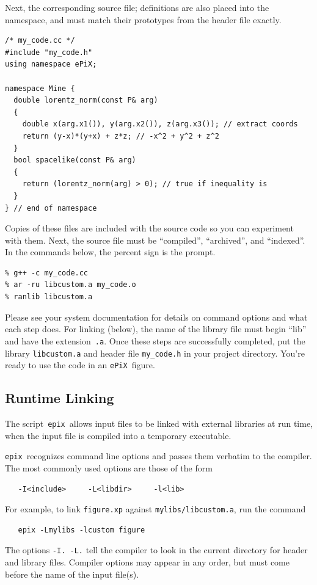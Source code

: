 \documentclass[12pt]{report}
\newcommand{\code}[1]{\texttt{#1}}
\newcommand{\filename}[1]{\texttt{#1}}
\newcommand{\ePiX}{\code{ePiX}}
\newcommand{\epix}{\code{epix}}
\begin{document}
Next, the corresponding source file; definitions are also placed into
the namespace, and must match their prototypes from the header file
exactly.
\begin{verbatim}
/* my_code.cc */
#include "my_code.h"
using namespace ePiX;

namespace Mine {
  double lorentz_norm(const P& arg)
  {
    double x(arg.x1()), y(arg.x2()), z(arg.x3()); // extract coords
    return (y-x)*(y+x) + z*z; // -x^2 + y^2 + z^2
  }
  bool spacelike(const P& arg)
  {
    return (lorentz_norm(arg) > 0); // true if inequality is
  }
} // end of namespace
\end{verbatim}
Copies of these files are included with the source code so you can
experiment with them. Next, the source file must be ``compiled'',
``archived'', and ``indexed''. In the commands below, the percent sign
is the prompt.
\begin{verbatim}
% g++ -c my_code.cc
% ar -ru libcustom.a my_code.o
% ranlib libcustom.a
\end{verbatim}
Please see your system documentation for details on command options
and what each step does. For linking (below), the name of the library
file must begin ``lib'' and have the extension~\filename{.a}. Once these
steps are successfully completed, put the library \filename{libcustom.a}
and header file \filename{my\_code.h} in your project directory. You're
ready to use the code in an \ePiX\ figure.


\subsection*{Runtime Linking}

The script~\epix\ allows input files to be linked with external
libraries at run time, when the input file is compiled into a
temporary executable.

\epix\ recognizes command line options and passes them verbatim to the
compiler. The most commonly used options are those of the form
\begin{verbatim}
   -I<include>     -L<libdir>     -l<lib>
\end{verbatim}
For example, to link \filename{figure.xp} against
\filename{mylibs/libcustom.a}, run the command
\begin{verbatim}
   epix -Lmylibs -lcustom figure
\end{verbatim}
The options \code{-I. -L.} tell the compiler to look in the current
directory for header and library files.  Compiler options may appear
in any order, but must come before the name of the input file(s).
\end{document}
